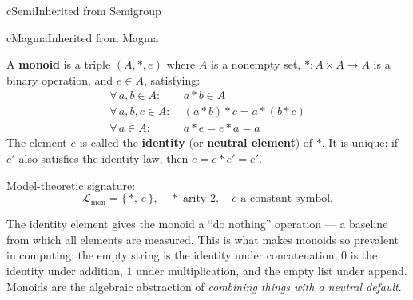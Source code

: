 \begin{bpinh}{cSemi}{Inherited from Semigroup}
\end{bpinh}

\begin{bpinh}{cMagma}{Inherited from Magma}
\end{bpinh}

\begin{definition}[Monoid]
\label{def:formal-model-theoretic-structures-l434}
  A \textbf{monoid} is a triple $(A, *, e)$ where $A$ is a nonempty set,
  $* : A \times A \to A$ is a binary operation, and $e \in A$, satisfying:
  \begin{align*}
    \forall\,a,b \in A:&\; a * b \in A \tag{Closure}\\
    \forall\,a,b,c \in A:&\; (a*b)*c = a*(b*c) \tag{Associativity}\\
    \forall\,a \in A:&\; a * e = e * a = a \tag{Identity}
  \end{align*}
  The element $e$ is called the \textbf{identity} (or \textbf{neutral element})
  of $*$.  It is unique: if $e'$ also satisfies the identity law, then
  $e = e * e' = e'$.

  \medskip\noindent
  Model-theoretic signature:
  \[
    \mathcal{L}_{\mathrm{mon}} = \{\,*,\, e\,\},
    \quad * \text{ arity } 2,\quad e \text{ a constant symbol.}
  \]
\end{definition}

\begin{remark}
  The identity element gives the monoid a ``do nothing'' operation --- a baseline
  from which all elements are measured.  This is what makes monoids so prevalent
  in computing: the empty string is the identity under concatenation, $0$ is the
  identity under addition, $1$ under multiplication, and the empty list under
  append.  Monoids are the algebraic abstraction of \emph{combining things with
  a neutral default}.
\end{remark}



